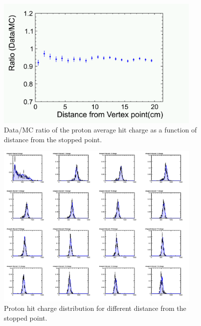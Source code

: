 \documentclass{cernyrep}
\begin{document}
\begin{figure}[htbp]
 \begin{center}
  \includegraphics[width=100mm,bb=0 0 861 566]{KaonQRvsR.png}
 \end{center}
 \caption{Data/MC ratio of the proton average hit charge as a function of distance from the stopped point.}
 \label{fig:KaonQRvsR}
\end{figure}

\begin{figure}[htbp]
 \begin{center}
  \includegraphics[width=100mm,bb=0 0 1196 973]{ProtonQvsR.png}
 \end{center}
 \caption{Proton hit charge distribution for different distance from the stopped point.}
 \label{fig:ProtonQvsR}
\end{figure}
\end{document}

